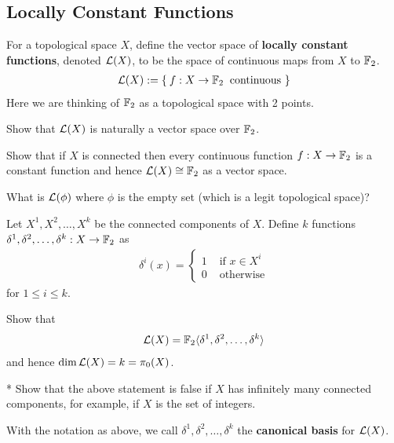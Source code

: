 \subsection{Locally Constant Functions}
\begin{definition}
	For a topological space $X$, define the vector space of \textbf{locally constant functions}, denoted $\mathcal{L}(X)$, to be the space of continuous maps from $X$ to $\mathbb{F}_2$.
	\begin{align*}
		\mathcal{L}(X) := \{ \: f: X \rightarrow \mathbb{F}_2 \: \mbox{ continuous } \}
	\end{align*}
  Here we are thinking of $\mathbb{F}_2$ as a topological space with 2 points.
\end{definition}
\begin{ques}
  Show that $\mathcal{L}(X)$ is naturally a vector space over $\mathbb{F}_2$.
\end{ques}
\begin{ques}
  Show that if $X$ is connected then every continuous function $f: X \rightarrow \mathbb{F}_2$ is a constant function and hence $\mathcal{L}(X) \cong \mathbb{F}_2$ as a vector space.
\end{ques}
\begin{ques}
	What is $\mathcal{L}(\phi)$ where $\phi$ is the empty set (which is a legit topological space)?
\end{ques}
\noindent Let $X^1, X^2, \dots, X^k$ be the connected components of $X$. Define $k$ functions $\delta^1, \delta^2, \dots, \delta^k : X \rightarrow \mathbb{F}_2$ as
\begin{align*}
  \delta^i(x) = \begin{cases}
    1 & \mbox{ if $x \in X^i$} \\
    0 & \mbox{ otherwise}
\end{cases}
\end{align*}
for $1 \le i \le k$.\\
\begin{ques}
	Show that
	\begin{align*}
		\mathcal{L}(X) = \mathbb{F}_2 \langle \delta^1, \delta^2, \dots, \delta^k \rangle
	\end{align*}
	and hence $\dim \mathcal{L}(X) = k = \pi_0(X)$.
\end{ques}
\begin{ques}*
  Show that the above statement is false if $X$ has infinitely many connected components, for example, if $X$ is the set of integers.
\end{ques}
\begin{definition}
	With the notation as above, we call $\delta^1, \delta^2, \dots, \delta^k$ the \textbf{canonical basis} for $\mathcal{L}(X)$.
\end{definition}

